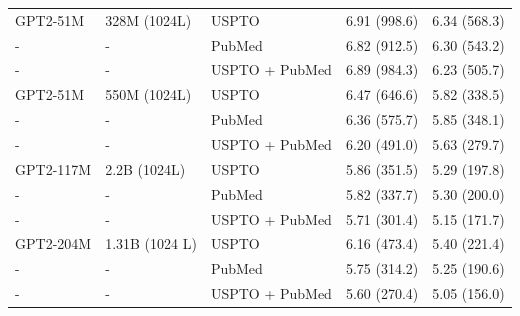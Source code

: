 \begin{table}[h]
\begin{tabularx}{1\textwidth}{lXXXX}
GPT2-51M & 328M (1024L) & USPTO  & 6.91 (998.6) & 6.34 (568.3) \\ 
- & - & PubMed & 6.82 (912.5) & 6.30 (543.2) \\ 
- & - & USPTO + PubMed & 6.89 (984.3) & 6.23 (505.7) \\
\hline
GPT2-51M & 550M (1024L) & USPTO  & 6.47 (646.6) & 5.82 (338.5) \\ 
- & - & PubMed & 6.36 (575.7) & 5.85 (348.1) \\ 
- & - & USPTO + PubMed & 6.20 (491.0) & 5.63 (279.7) \\
\hline
GPT2-117M & 2.2B (1024L) & USPTO  & 5.86 (351.5) & 5.29 (197.8) \\ 
- & - & PubMed & 5.82 (337.7) & 5.30 (200.0) \\ 
- & - & USPTO + PubMed & 5.71 (301.4) & 5.15 (171.7) \\ 
\hline
GPT2-204M & 1.31B (1024 L) & USPTO  & 6.16 (473.4) & 5.40 (221.4) \\ 
- & - & PubMed & 5.75 (314.2) & 5.25 (190.6) \\ 
- & - & USPTO + PubMed & 5.60 (270.4) & 5.05 (156.0) \\ 

\bottomrule
\end{tabularx}
\label{tab:div_vs_ce_val_cont}

\end{table}

